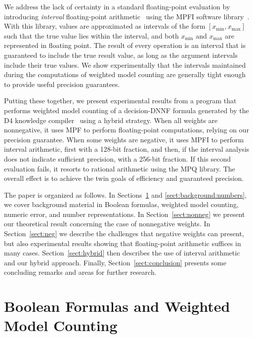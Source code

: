 \documentclass[letterpaper,USenglish,cleveref, autoref, thm-restate]{lipics-v2021}
\newcommand{\xmin}{x_{\textrm{min}}}
\newcommand{\xmax}{x_{\textrm{max}}}
\begin{document}
We address the lack of certainty in a standard floating-point
evaluation by introducing \emph{interval} floating-point arithmetic~\cite{hickey:jacm:2001}
using the MPFI software library~\cite{revol:rc:2005}. With this
library, values are approximated as intervals of the form $[\xmin,  \xmax]$ such that the true value lies within the interval, and both
$\xmin$ and $\xmax$ are represented in floating point.  The result of
every operation is an interval that is guaranteed to include the true
result value, as long as the argument intervals include their true
values.  We show experimentally that the intervals maintained during
the computations of weighted model counting are generally tight enough
to provide useful precision guarantees.

Putting these together, we present experimental results from a program
that performs weighted model counting of a decision-DNNF formula
generated by the D4 knowledge compiler~\cite{lagniez:ijcai:2017} using
a hybrid strategy.  When all weights are nonnegative, it uses MPF to
perform floating-point computations, relying on our precision
guarantee.  When some weights are negative, it uses MPFI to perform
interval arithmetic, first with a 128-bit fraction, and then,
if the interval analysis does not indicate sufficient
precision,
with a
256-bit fraction.  If this second evaluation fails, it resorts to rational
arithmetic using the MPQ library.  The overall effect is to achieve
the twin goals of efficiency and guaranteed precision.

The paper is organized as follows.  In
Sections~\ref{sect:background:boolean} and
\ref{sect:background:numbers}, we cover background material in Boolean
formulas, weighted model counting, numeric error, and number
representations.  In Section~\ref{sect:nonneg} we present our
theoretical result concerning the case of nonnegative weights.  In
Section~\ref{sect:neg} we describe the challenges that negative
weights can present, but also experimental results showing that
floating-point arithmetic suffices in many cases.
Section~\ref{sect:hybrid} then describes the use of interval
arithmetic and our hybrid approach.  
Finally, Section~\ref{sect:conclusion}
presents some concluding remarks and  areas for
further research.


\section{Boolean Formulas and Weighted Model Counting}
\label{sect:background:boolean}
\end{document}
